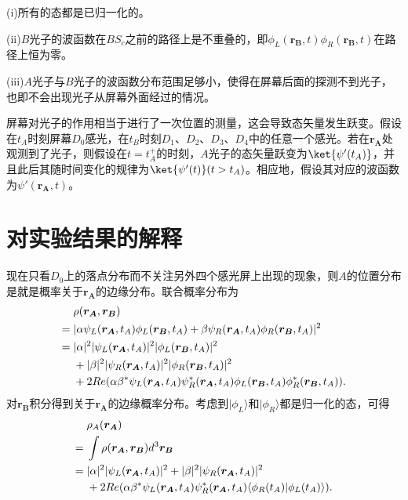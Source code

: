 (i)所有的态都是已归一化的。

(ii)$B$光子的波函数在$BS_c$之前的路径上是不重叠的，即$\phi_L(\boldsymbol{r_B},t)\phi_R(\boldsymbol{r_B},t)$在路径上恒为零。

(iii)$A$光子与$B$光子的波函数分布范围足够小，使得在屏幕后面的探测不到光子，也即不会出现光子从屏幕外面经过的情况。


屏幕对光子的作用相当于进行了一次位置的测量，这会导致态矢量发生跃变。假设在$t_A$时刻屏幕$D_0$感光，在$t_B$时刻$D_1$、$D_2$、$D_3$、$D_4$中的任意一个感光。若在$\boldsymbol{r_A}$处观测到了光子，则假设在$t=t_A^+$的时刻，$A$光子的态矢量跃变为$\ket{\psi'(t_A)}$，并且此后其随时间变化的规律为$\ket{\psi'(t)}(t>t_A)$。相应地，假设其对应的波函数为$\psi'(\boldsymbol{r_A},t)$。

\section{对实验结果的解释}
现在只看$D_0$上的落点分布而不关注另外四个感光屏上出现的现象，则$A$的位置分布是就是概率关于$\boldsymbol{r_A}$的边缘分布。联合概率分布为
\begin{align}
&\rho(\boldsymbol{r_A},\boldsymbol{r_B}) \notag \\
={}&|\alpha\psi_L(\boldsymbol{r_A},t_A)\phi_L(\boldsymbol{r_B},t_A)+\beta\psi_R(\boldsymbol{r_A},t_A)\phi_R(\boldsymbol{r_B},t_A)|^2 \notag \\
={}&|\alpha|^2|\psi_L(\boldsymbol{r_A},t_A)|^2|\phi_L(\boldsymbol{r_B},t_A)|^2 \notag \\
&+|\beta|^2|\psi_R(\boldsymbol{r_A},t_A)|^2|\phi_R(\boldsymbol{r_B},t_A)|^2 \notag \\
&+2Re(\alpha\beta^*\psi_L(\boldsymbol{r_A},t_A)\psi_R^*(\boldsymbol{r_A},t_A)\phi_L(\boldsymbol{r_B},t_A)\phi_R^*(\boldsymbol{r_B},t_A)).
\label{eq:联合概率分布}
\end{align}
对$\boldsymbol{r_B}$积分得到关于$\boldsymbol{r_A}$的边缘概率分布。考虑到$|\phi_L\rangle$和$|\phi_R\rangle$都是归一化的态，可得
\begin{align}
&\rho_A(\boldsymbol{r_A}) \notag \\
={}&\int \rho(\boldsymbol{r_A},\boldsymbol{r_B})d^3\boldsymbol{r_B} \notag \\
={}&|\alpha|^2|\psi_L(\boldsymbol{r_A},t_A)|^2+|\beta|^2|\psi_R(\boldsymbol{r_A},t_A)|^2 \notag \\
&+2Re(\alpha\beta^*\psi_L(\boldsymbol{r_A},t_A)\psi_R^*(\boldsymbol{r_A},t_A)\langle\phi_R(t_A)|\phi_L(t_A)\rangle).
\end{align}
